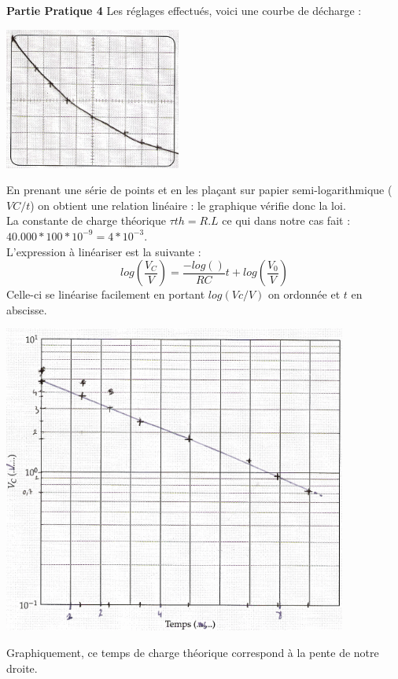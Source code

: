 \documentclass	[11pt, a4paper, openany]{book}
\begin{document}
		\textbf{Partie Pratique 4}
		Les réglages effectués, voici une courbe de décharge : 
		\begin{center}
			\includegraphics[scale=0.5]{labo/image22.png}
		\end{center}
		En prenant une série de points et en les plaçant sur papier semi-logarithmique ($VC/t$) on obtient une relation linéaire : le graphique vérifie donc la loi.\\
		La constante de charge théorique $\tau{th} = R.L$ ce qui dans notre cas fait : $40.000 * 100 * 10^{-9} = 4*10^{-3}$.\\
		L'expression à linéariser est la suivante : 
		\begin{equation}
			log\left(\frac{V_C}{V}\right) = \frac{-log()}{RC}t + log\left(\frac{V_0}{V}\right)
		\end{equation}
		Celle-ci se linéarise facilement en portant $log(Vc/V)$ on ordonnée et $t$ en abscisse.
		\begin{center}
			\includegraphics[scale=0.5]{labo/image23.png}
		\end{center}
		Graphiquement, ce temps de charge théorique correspond à la pente de notre droite.\\
		
\end{document}

